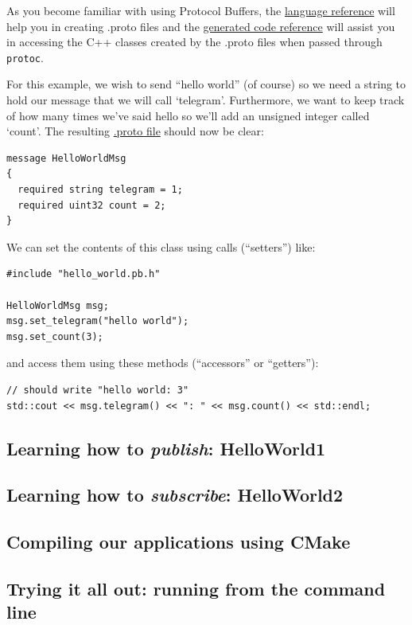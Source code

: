 \documentclass[11pt, letterpaper]{article}
\begin{document}
As you become familiar with using Protocol Buffers, the \href{http://code.google.com/apis/protocolbuffers/docs/proto.html}{language reference} will help you in creating .proto files and the \href{http://code.google.com/apis/protocolbuffers/docs/reference/cpp-generated.html}{generated code reference} will assist you in accessing the C++ classes created by the .proto files when passed through \texttt{protoc}.

For this example, we wish to send ``hello world'' (of course) so we need a string to hold our message that we will call `telegram'. Furthermore, we want to keep track of how many times we've said hello so we'll add an unsigned integer called `count'. The resulting \href{http://bazaar.launchpad.net/~goby-dev/goby/trunk/files/head:/src/core/examples/ex1_hello_world/hello_world.proto}{.proto file} should now be clear:
\begin{verbatim}
message HelloWorldMsg
{
  required string telegram = 1;
  required uint32 count = 2;
}
\end{verbatim}

We can set the contents of this class using calls (``setters'') like:
\begin{verbatim}
#include "hello_world.pb.h"

HelloWorldMsg msg;
msg.set_telegram("hello world");
msg.set_count(3);
\end{verbatim}

and access them using these methods (``accessors'' or ``getters''):

\begin{verbatim}
// should write "hello world: 3"
std::cout << msg.telegram() << ": " << msg.count() << std::endl;
\end{verbatim}


\subsection{Learning how to \textit{publish}: HelloWorld1}



\subsection{Learning how to \textit{subscribe}: HelloWorld2}

\subsection{Compiling our applications using CMake}

\subsection{Trying it all out: running from the command line}
\end{document}
